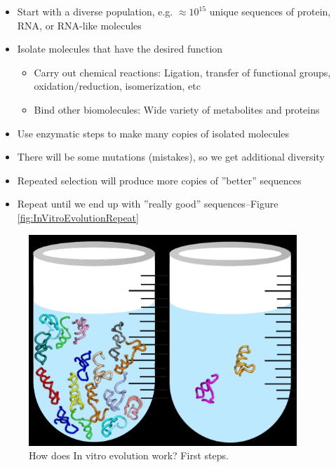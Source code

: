 \documentclass[]{article}
\begin{document}
\begin{itemize}
	\item Start with a diverse population, e.g. $\approx 10^{15}$ 
	unique sequences of protein, RNA, or RNA-like molecules
	\item Isolate molecules that have the desired function
	\begin{itemize}
		\item Carry out chemical reactions:
		Ligation, transfer of functional groups,
		oxidation/reduction, isomerization, etc
		\item Bind other biomolecules:
		Wide variety of metabolites and proteins
	\end{itemize}
	\item Use enzymatic steps to make many copies of isolated molecules
	\item There will be some mutations (mistakes), so we get additional diversity
	\item Repeated selection will produce more copies of ''better'' sequences
	\item Repeat until we end up with ''really good'' sequences--Figure \ref{fig:InVitroEvolutionRepeat}
\end{itemize}

\begin{figure}[H]
	\caption{How does In vitro evolution work? First steps.}\label{fig:InVitroEvolution}
	\includegraphics[width=0.9\textwidth]{InVitroEvolution}
\end{figure}
\end{document}
